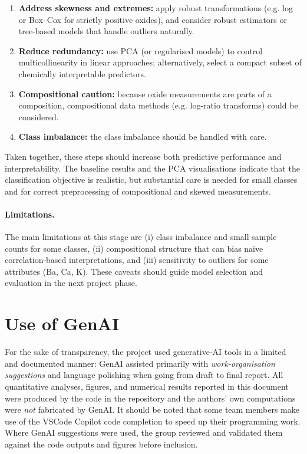 \documentclass[dtu]{dtuarticle}
\begin{document}
	\begin{enumerate}
	  \item \textbf{Address skewness and extremes:} apply robust transformations (e.g. log or Box--Cox for
	    strictly positive oxides), and consider robust estimators or tree-based models
	    that handle outliers naturally.
	  \item \textbf{Reduce redundancy:} use PCA (or regularised models) to control multicollinearity in linear
	    approaches; alternatively, select a compact subset of chemically interpretable predictors.
	  \item \textbf{Compositional caution:} because oxide measurements are parts of a composition,
	  compositional data methods (e.g. log-ratio transforms) could be considered.
	  \item \textbf{Class imbalance:} the class imbalance should be handled with care.
	\end{enumerate}

	Taken together, these steps should increase both predictive performance and interpretability. The
	baseline results and the PCA visualisations indicate that the classification objective is realistic, but
	substantial care is needed for small classes and for correct preprocessing of compositional and skewed
	measurements.

	\paragraph{Limitations.} The main limitations at this stage are (i) class imbalance and small sample
	counts for some classes, (ii) compositional structure that can bias naive correlation-based interpretations,
	and (iii) sensitivity to outliers for some attributes (Ba, Ca, K). These caveats should guide model
	selection and evaluation in the next project phase.



	\section*{Use of GenAI}
	For the sake of transparency, the project used generative-AI tools in a limited and documented manner:
	GenAI assisted primarily with \emph{work-organisation suggestions} and language polishing when going from draft to final report. All quantitative analyses, figures, and
	numerical results reported in this document were produced by the code in the repository and the
	authors' own computations were \emph{not} fabricated by GenAI. It should be noted that some team members make use of the VSCode Copilot code completion to speed up their programming work. Where GenAI suggestions
	were used, the group reviewed and validated them against the code outputs and figures before inclusion.
\end{document}
